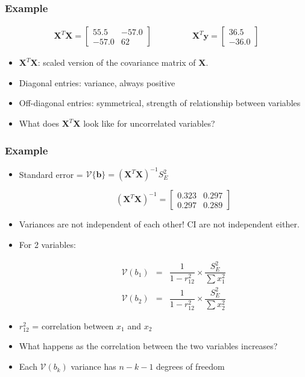 \begin{frame}\frametitle{Example}

	$$
	\begin{array}{lr}
		\mathbf{X}^T\mathbf{X} =
		\begin{bmatrix}
			55.5 & -57.0 \\-57.0 & 62
		\end{bmatrix}
		&\qquad\qquad \mathbf{X}^T\mathbf{y} =
		\begin{bmatrix}
			36.5 \\
			-36.0
		\end{bmatrix}
	\end{array}
	$$
	\begin{itemize}
		\item	$\mathbf{X}^T\mathbf{X}$: scaled version of the covariance matrix of $\mathbf{X}$.
		\item	Diagonal entries: variance, always positive
		\item	Off-diagonal entries: symmetrical, strength of relationship between variables
		\item	What does $\mathbf{X}^T\mathbf{X}$ look like for uncorrelated variables?
	\end{itemize}
\end{frame}

\begin{frame}\frametitle{Example}
	\begin{itemize}
		\item	Standard error = $\mathcal{V}\{\mathbf{b}\} = \left( \mathbf{X}^T\mathbf{X} \right)^{-1} S_E^2$
	\end{itemize}

	$$ \qquad\qquad \left(\mathbf{X}^T\mathbf{X}\right)^{-1}=
	\begin{bmatrix}
		0.323 & 0.297 \\
		0.297 & 0.289
	\end{bmatrix}
	$$
	\begin{itemize}
		\item	Variances are not independent of each other! CI are not independent either.
		\item	For 2 variables:
	\end{itemize}

	$$
	\begin{array}{lcr}
		\qquad\qquad \mathcal{V}\left(b_1\right) &=& \dfrac{1}{1-r^2_{12}} \times \dfrac{S_E^2}{\sum{x_1^2}} \\
		\qquad\qquad \mathcal{V}\left(b_2\right) &=& \dfrac{1}{1-r^2_{12}} \times \dfrac{S_E^2}{\sum{x_2^2}}
	\end{array}
	$$
	\begin{itemize}
		\item	$r^2_{12}$ = correlation between $x_1$ and $x_2$
		\item	What happens as the correlation between the two variables increases?
		\item	Each $\mathcal{V}\left(b_k\right)$ variance has $n-k-1$ degrees of freedom
	\end{itemize}
\end{frame}

